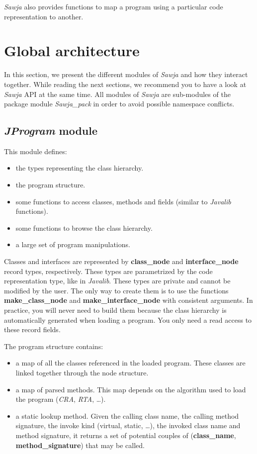 \documentclass{article}
\begin{document}
\emph{Sawja} also provides functions to map a program using a
particular code representation to another.

\section{Global architecture}

In this section, we present the different modules of \emph{Sawja}
and how they interact together. While reading the next sections, we
recommend you to have a look at \emph{Sawja} API at the same time.
All modules of \emph{Sawja} are sub-modules of the package module
\emph{Sawja\_pack} in order to avoid possible namespace conflicts.

\subsection{\emph{JProgram} module}

This module defines:

\begin{itemize}
\item
  the types representing the class hierarchy.
\item
  the program structure.
\item
  some functions to access classes, methods and fields (similar to
  \emph{Javalib} functions).
\item
  some functions to browse the class hierarchy.
\item
  a large set of program manipulations.
\end{itemize}
Classes and interfaces are represented by \textbf{class\_node} and
\textbf{interface\_node} record types, respectively. These types
are parametrized by the code representation type, like in
\emph{Javalib}. These types are private and cannot be modified by
the user. The only way to create them is to use the functions
\textbf{make\_class\_node} and \textbf{make\_interface\_node} with
consistent arguments. In practice, you will never need to build
them because the class hierarchy is automatically generated when
loading a program. You only need a read access to these record
fields.

The program structure contains:

\begin{itemize}
\item
  a map of all the classes referenced in the loaded program. These
  classes are linked together through the node structure.
\item
  a map of parsed methods. This map depends on the algorithm used to
  load the program (\emph{CRA}, \emph{RTA}, \ldots{}).
\item
  a static lookup method. Given the calling class name, the calling
  method signature, the invoke kind (virtual, static, \ldots{}), the
  invoked class name and method signature, it returns a set of
  potential couples of (\textbf{class\_name},
  \textbf{method\_signature}) that may be called.
\end{itemize}
\end{document}
